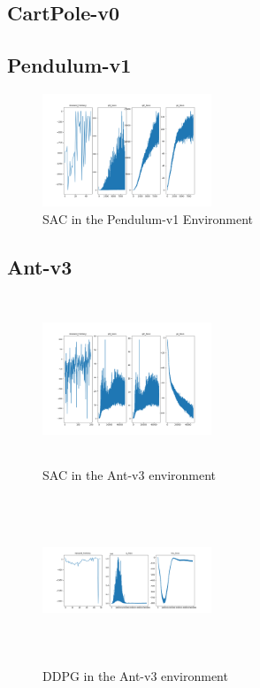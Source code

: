 \documentclass[conference]{IEEEtran}
\begin{document}
\blindtext

\subsection{CartPole-v0}

\blindtext

\subsection{Pendulum-v1}

\begin{figure}
    \includegraphics[width=0.45\textwidth]{sac-pendulum}
    \caption{SAC in the Pendulum-v1 Environment}
\end{figure}

\blindtext

\subsection{Ant-v3}

\begin{figure}
    \includegraphics[width=0.45\textwidth, height=5cm]{sac-ant}
    \caption{SAC in the Ant-v3 environment}
\end{figure}

\begin{figure}
    \includegraphics[width=0.45\textwidth, height=5cm]{ddpg-ant}
    \caption{DDPG in the Ant-v3 environment}
\end{figure}
\end{document}
